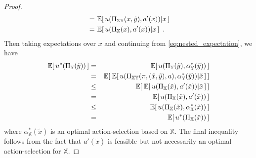 \documentclass[11pt,onecolumn]{article}
\theoremstyle{plain}
\newcommand{\ev}[1]{\hspace{+0.20ex}\mathbb{E}\hspace{-0.40ex}\left[ \, #1 \, \right]}
\newcommand{\iX}[0]{{\mathbb{X}}}
\newcommand{\iY}[0]{{\mathbb{Y}}}
\newcommand{\iXY}[0]{{\mathbb{XY}}}
\begin{document}
\begin{proof}
\begin{align}
     &= \ev{u(\Pi_\iXY(x,\tilde{y}),a'(x)) | x} \\
     &= \ev{u(\Pi_\iX(x),a'(x)) | x} \ .
\end{align}
Then taking expectations over $x$ and continuing from \eqref{eq:nested_expectation}, we have
\begin{eqnarray*}
\ev{u^*(\Pi_\iY(\tilde{y}))} &=&
\ev{u(\Pi_\iY(\tilde{y}),\alpha_\iY^*(\tilde{y}))} \\ &=& \ev{\ev{u(\Pi_\iXY(\pi,(\tilde{x},\tilde{y}),a),  \alpha_\iY^*(\tilde{y})) | \tilde{x}}} \\
&\leq& \ev{\ev{u(\Pi_\iX(\tilde{x}),a'(\tilde{x})) | \tilde{x}}} \\
&=& \ev{u(\Pi_\iX(\tilde{x}),a'(\tilde{x})) } \\
&\leq& \ev{u(\Pi_\iX(\tilde{x}),\alpha_\iX^*(\tilde{x})) } \\
&=& \ev{u^*(\Pi_\iX(\tilde{x}))}
\end{eqnarray*}
where $\alpha_\iX^*(\tilde{x})$ is an optimal action-selection based on $\iX$. The final inequality follows from the fact that $a'(\tilde{x})$ is feasible but not necessarily an optimal action-selection for $\iX$.
\end{proof}
\clearpage

\end{document}
